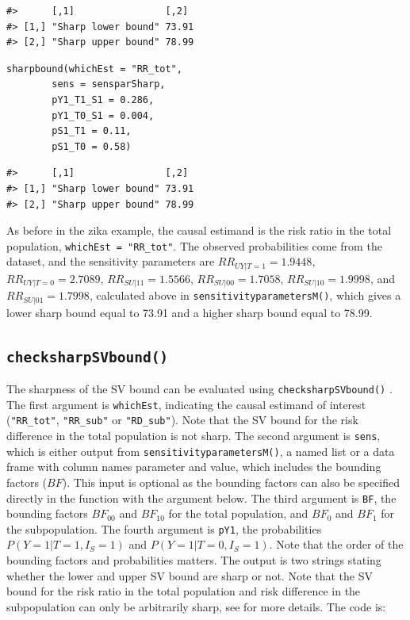 \begin{verbatim}
#>      [,1]                [,2] 
#> [1,] "Sharp lower bound" 73.91
#> [2,] "Sharp upper bound" 78.99
\end{verbatim}

\begin{verbatim}
sharpbound(whichEst = "RR_tot",
        sens = sensparSharp,
        pY1_T1_S1 = 0.286,
        pY1_T0_S1 = 0.004,
        pS1_T1 = 0.11,
        pS1_T0 = 0.58)
\end{verbatim}

\begin{verbatim}
#>      [,1]                [,2] 
#> [1,] "Sharp lower bound" 73.91
#> [2,] "Sharp upper bound" 78.99
\end{verbatim}

As before in the zika example, the causal estimand is the risk ratio in the
total population, \texttt{whichEst\ =\ "RR\_tot"}. The observed probabilities come from
the dataset, and the sensitivity parameters are \(RR_{UY|T=1}=1.9448\),
\(RR_{UY|T=0}=2.7089\), \(RR_{SU|11}=1.5566\), \(RR_{SU|00}=1.7058\),
\(RR_{SU|10}=1.9998\), and \(RR_{SU|01}=1.7998\), calculated above in
\texttt{sensitivityparametersM()}, which gives a lower sharp bound equal to 73.91 and a
higher sharp bound equal to 78.99.

\subsection{\texorpdfstring{\texttt{checksharpSVbound()}}{checksharpSVbound()}}\label{checksharpsvbound}

The sharpness of the SV bound can be evaluated using \texttt{checksharpSVbound()}
\citep{zetterstrom2025investigations}. The first argument is
\texttt{whichEst}, indicating the causal estimand of interest (\texttt{"RR\_tot"}, \texttt{"RR\_sub"}
or \texttt{"RD\_sub"}). Note that the SV bound for the risk difference in the total
population is not sharp. The second argument is \texttt{sens}, which is either output
from \texttt{sensitivityparametersM()}, a named list or a data frame with
column names parameter and value, which includes the bounding factors (\(BF\)).
This input is optional as the bounding factors can also be specified
directly in the function with the argument below. The third argument is \texttt{BF},
the bounding factors \(BF_{00}\) and \(BF_{10}\) for the total population, and \(BF_0\)
and \(BF_1\) for the subpopulation. The fourth argument is \texttt{pY1}, the probabilities
\(P(Y=1|T=1,I_S=1)\) and \(P(Y=1|T=0,I_S=1)\). Note that the order of the bounding
factors and probabilities matters. The output is two strings stating whether the
lower and upper SV bound are sharp or not. Note that the SV bound for the risk
ratio in the total population and risk difference in the subpopulation can only
be arbitrarily sharp, see \citep{zetterstrom2025investigations} for more details.
The code is:

